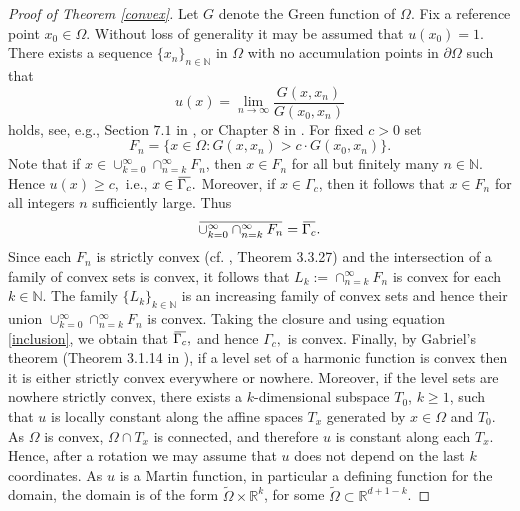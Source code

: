 \documentclass[11pt]{amsart}
\newcommand{\R}{{\mathbb{R}}}
\newcommand{\overbar}[1]{\mkern 1.5mu\overline{\mkern-1.5mu#1\mkern-1.5mu}\mkern 1.5mu}
\theoremstyle{definition}
\theoremstyle{remark}
\begin{document}
\begin{proof}[Proof of Theorem \ref{convex}]
Let $G$ denote the Green function of $\Omega.$ Fix a reference point $x_0\in\Omega$. Without loss of generality it may be assumed that $u(x_0) = 1$. There exists a  sequence $\{x_n\}_{n\in\mathbb{N}}$ in $\Omega$ with no accumulation points in $\partial\Omega$ such that 
$$u(x) = \lim_{n\to\infty}\dfrac{G(x, x_n)}{G(x_0, x_n)}$$
holds, see, e.g., Section $7.1$ in \cite{Pin}, or Chapter $8$ in \cite{AG}. 
For fixed $c>0$ set $$F_n = \{x\in\Omega: G(x, x_n) > c\cdot G(x_0, x_n)\}.$$
Note that if $x\in\cup_{k=0}^{\infty}\cap_{n=k}^{\infty}F_n$, then $x\in F_n$ for all but finitely many $n\in\mathbb{N}$. Hence $u(x)\geq c,$ i.e., $x\in\overbar{\Gamma_c}.$ Moreover, if $x\in\Gamma_c$, then it follows that $x\in F_n$ for all integers $n$ sufficiently large. Thus
\begin{equation}\label{inclusion}
\overbar{\cup_{k=0}^{\infty}\cap_{n=k}^{\infty}F_n}=\overbar{\Gamma_c}.
\end{equation}
Since each $F_n$ is strictly convex (cf. \cite{Ho}, Theorem 3.3.27) and the intersection of a family of convex sets is convex, it follows that $L_k:= \cap_{n=k}^{\infty}F_n$ is convex for each $k\in\mathbb{N}$. The family $\{L_k\}_{k\in\mathbb{N}}$ is an increasing family of convex sets and hence their union $\cup_{k=0}^{\infty}\cap_{n=k}^{\infty}F_n$ is convex. Taking the closure and using equation \eqref{inclusion}, we obtain that $\overbar{\Gamma_c},$ and hence $\Gamma_c,$ is convex.
Finally, by Gabriel's theorem (Theorem 3.1.14 in \cite{Ho}), if a level set of a harmonic function is convex then it is either strictly convex everywhere or nowhere.  Moreover, if the level sets are nowhere strictly convex, there exists a $k$-dimensional subspace $T_0$, $k \geq 1$, such that $u$ is locally constant along the affine spaces $T_x$ generated by $x \in \Omega$ and $T_0$.  As $\Omega$ is convex, $\Omega \cap T_x$ is connected, and therefore $u$ is constant along each $T_x$.  Hence, after a rotation we may assume that $u$ does not depend on the last $k$ coordinates.  As $u$ is a Martin function, in particular a defining function for the domain, the domain is of the form $\widetilde{\Omega} \times \R^k$, for some $\widetilde{\Omega} \subset \R^{d+1-k}$. 
\end{proof}
\end{document}
